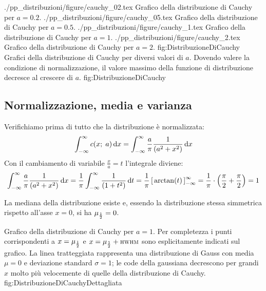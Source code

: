 \panelfig
{\twobytwotexfig
{./pp_distribuzioni/figure/cauchy_02.tex}
{Grafico della distribuzione di Cauchy per $a=0.2$.}
{./pp_distribuzioni/figure/cauchy_05.tex}
{Grafico della distribuzione di Cauchy per $a=0.5$.}
{./pp_distribuzioni/figure/cauchy_1.tex}
{Grafico della distribuzione di Cauchy per $a=1$.}
{./pp_distribuzioni/figure/cauchy_2.tex}
{Grafico della distribuzione di Cauchy per $a=2$.}
{fig:DistribuzioneDiCauchy}}
{Grafici della distribuzione di Cauchy per diversi valori di $a$.
Dovendo valere la condizione di normalizzazione, il valore massimo della
funzione di distribuzione decresce al crescere di $a$.}
{fig:DistribuzioneDiCauchy}


\subsection{Normalizzazione, media e varianza}

Verifichiamo prima di tutto che la distribuzione \`e normalizzata:
$$
\dintegral{\cauchypdf{x}{a}}{x}{-\infty}{\infty} =
\dintegral{\frac{a}{\pi} \frac{1}{(a^2 + x^2)}}{x}{-\infty}{\infty}
$$
Con il cambiamento di variabile $\frac{x}{a} = t$ l'integrale diviene:
$$
\dintegral{\frac{a}{\pi} \frac{1}{(a^2 + x^2)}}{x}{-\infty}{\infty} =
\frac{1}{\pi} \dintegral{\frac{1}{(1+t^2)}}{t}{-\infty}{\infty} =
\frac{1}{\pi} \eval{\arctan (t)}{-\infty}{\infty} =
\frac{1}{\pi} \cdot \left( \frac{\pi}{2} + \frac{\pi}{2} \right) = 1
$$

La mediana della distribuzione 
esiste e, essendo la distribuzione stessa simmetrica rispetto all'asse $x=0$,
si ha $\median = 0$.

\panelfig
{}
{Grafico della distribuzione di Cauchy per $a = 1$.
Per completezza i punti corrispondenti a $x = \median$ e $x = \median + \hwhm$
sono esplicitamente indicati sul grafico.
La linea tratteggiata rappresenta una distribuzione di Gauss con media
$\mu = 0$ e deviazione standard $\sigma = 1$; le code
della gaussiana decrescono per grandi $x$ molto pi\`u velocemente di
quelle della distribuzione di Cauchy.}
{fig:DistribuzioneDiCauchyDettagliata}

